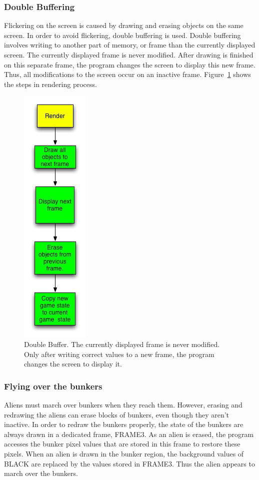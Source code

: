 \documentclass[11pt,letter,oneside]{report}
\begin{document}
\subsubsection{Double Buffering}
Flickering on the screen is caused by drawing and erasing objects on the same screen. In order to avoid flickering, double buffering is used. Double buffering involves writing to another part of memory, or frame than the currently displayed screen. The currently displayed frame is never modified.  After drawing is finished on this separate frame, the program changes the screen to display this new frame. Thus, all modifications to the screen occur on an inactive frame. Figure~\ref{fig:render} shows the steps in rendering process.

\begin{figure}[ht]
\centering
\label{fig:render}
\includegraphics[scale=.5]{Render.jpg}
\caption{Double Buffer. The currently displayed frame is never modified. Only after writing correct values to a new frame, the program changes the screen to display it.}
\end{figure}

\subsubsection{Flying over the bunkers}
Aliens must march over bunkers when they reach them. However, erasing and redrawing the aliens can erase blocks of bunkers, even though they aren't inactive. In order to redraw the bunkers properly, the state of the bunkers are always drawn in a dedicated frame, FRAME3.  As an alien is erased, the program accesses the bunker pixel values that are stored in this frame to restore these pixels. When an alien is drawn in the bunker region, the background values of BLACK are replaced by the values stored in FRAME3. Thus the alien appears to march over the bunkers.
\end{document}
